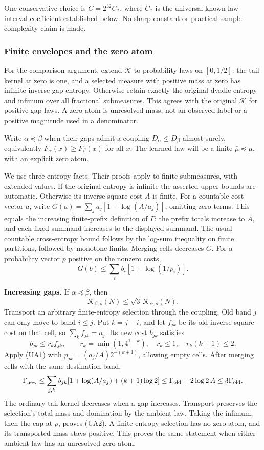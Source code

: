 One conservative choice is $C=2^{32}C_*$, where $C_*$ is the universal
known-law interval coefficient established below. No sharp constant or
practical sample-complexity claim is made.

\subsubsection{Finite envelopes and the zero atom}

For the comparison argument, extend $\mathcal K$ to probability laws on $[0,1/2]$:
the tail kernel at zero is one, and a selected measure with positive mass
at zero has infinite inverse-gap entropy. Otherwise retain exactly the
original dyadic entropy and infimum over all fractional submeasures. This
agrees with the original $\mathcal K$ for positive-gap laws. A zero atom is unresolved
mass, not an observed label or a positive magnitude used in a denominator.

Write $\alpha\preceq\beta$ when their gaps admit a coupling
$D_\alpha\le D_\beta$ almost surely, equivalently
$F_\alpha(x)\ge F_\beta(x)$ for all $x$. The learned law will be a finite
$\bar\mu\preceq\mu$, with an explicit zero atom.

We use three entropy facts. Their proofs apply to finite submeasures, with
extended values. If the original entropy is infinite the asserted upper
bounds are automatic. Otherwise its inverse-square cost $A$ is finite.
For a countable cost vector $a$, write
$G(a)=\sum_j a_j[1+\log(A/a_j)]$, omitting zero terms. This equals the
increasing finite-prefix definition of $\Gamma$: the prefix totals increase
to $A$, and each fixed summand increases to the displayed summand. The
usual countable cross-entropy bound follows by the log-sum inequality on
finite partitions, followed by monotone limits. Merging cells decreases
$G$. For a probability vector $p$ positive on the nonzero costs,
\[
 G(b)\le\sum_i b_i[1+\log(1/p_i)].                      \tag{UA1}
\]

\textbf{Increasing gaps.} If $\alpha\preceq\beta$, then
\[
 \mathcal K_{\beta,\rho}(N)\le\sqrt3\,\mathcal K_{\alpha,\rho}(N).        \tag{UA2}
\]
Transport an arbitrary finite-entropy selection through the coupling.
Old band $j$ can only move to band $i\le j$. Put $k=j-i$, and let $f_{jk}$
be its old inverse-square cost on that cell, so $\sum_k f_{jk}=a_j$.
Its new cost $b_{jk}$ satisfies
\[
 b_{jk}\le r_k f_{jk},\qquad r_k=\min(1,4^{1-k}),
 \quad r_k\le1,\quad r_k(k+1)\le2.
\]
Apply (UA1) with $p_{jk}=(a_j/A)2^{-(k+1)}$, allowing empty cells. After
merging cells with the same destination band,
\[
 \Gamma_{\rm new}\le
 \sum_{j,k}b_{jk}[1+\log(A/a_j)+(k+1)\log2]
 \le\Gamma_{\rm old}+2\log2\,A\le3\Gamma_{\rm old}.
\]
The ordinary tail kernel decreases when a gap increases. Transport preserves
the selection's total mass and domination by the ambient law. Taking the
infimum, then the cap at $\rho$, proves (UA2). A finite-entropy selection has
no zero atom, and its transported mass stays positive. This proves the same
statement when either ambient law has an unresolved zero atom.

